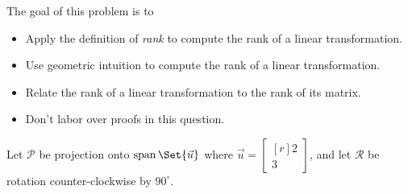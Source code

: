 \documentclass{problemset}
\DeclareMathOperator{\Span}{span}
\newcommand{\mat}[1]{\begin{bmatrix*}[r]#1\end{bmatrix*}}
\begin{document}
	\question
	\begin{annotation}
		\begin{goals}

			The goal of this problem is to
			\begin{itemize}
				\item Apply the definition of \emph{rank} to compute the rank of a linear transformation.
				\item Use geometric intuition to compute the rank of a linear transformation.
				\item Relate the rank of a linear transformation to the rank of its matrix.
			\end{itemize}
		\end{goals}

		\begin{notes}
			\begin{itemize}
				\item Don't labor over proofs in this question.
			\end{itemize}
		\end{notes}
	\end{annotation}
	\label{rankOfMatricesAndTransformations}
	Let $\mathcal P$ be projection onto $\Span\Set{\vec u}$ where $\vec u=\mat{2\\3}$,
	and let $\mathcal R$ be rotation counter-clockwise by $90^\circ$.
\end{document}
